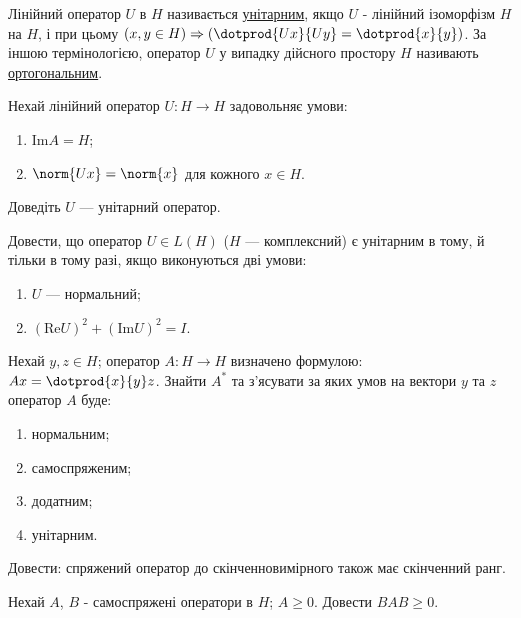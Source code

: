 \begin{theory}
    Лінійний оператор $U$ в $H$ називається \uline{унітарним}, якщо
    $U$ - лінійний ізоморфізм $H$ на $H$, і при цьому $(x, y \in H) \Rightarrow 
    \left(\dotprod{Ux}{Uy} = \dotprod{x}{y}\right)$. За іншою термінологією, оператор
    $U$ у випадку дійсного простору $H$ називають \uline{ортогональним}.
\end{theory}

\begin{exercise}
    Нехай лінійний оператор $U:H \to H$ задовольняє умови:
    \begin{enumerate}[label=\ukr*)]
        \item $\mathrm{Im}A = H$;
        \item $\norm{Ux} = \norm{x}$ для кожного $x \in H$.
    \end{enumerate}
    Доведіть $U$ --- унітарний оператор.
\end{exercise}

\begin{exercise}
    Довести, що оператор $U \in L(H)$ ($H$ --- комплексний) є унітарним в тому,
    й тільки в тому разі, якщо виконуються дві умови:
    \begin{enumerate}[label=\ukr*)]
        \item $U$ --- нормальний;
        \item $(\mathrm{Re}U)^2 + (\mathrm{Im}U)^2 = I$.
    \end{enumerate}
\end{exercise}

\begin{exercise}
    Нехай $y, z \in H$; оператор $A: H \to H$ визначено формулою: $Ax = \dotprod{x}{y}z$.
    Знайти $A^*$ та з'ясувати за яких умов на вектори $y$ та $z$ оператор $A$ буде:
    \begin{enumerate}[label=\ukr*)]
        \item нормальним;
        \item самоспряженим;
        \item додатним;
        \item унітарним.
    \end{enumerate}
\end{exercise}

\begin{exercise}
    Довести: спряжений оператор до скінченновимірного також має скінченний ранг.
\end{exercise}

\begin{exercise}
    Нехай $A$, $B$ - самоспряжені оператори в $H$; $A \geq 0$.
    Довести $BAB \geq 0$.
\end{exercise}
